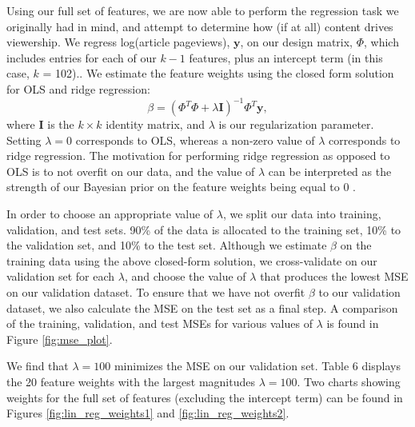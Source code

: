 \documentclass[fleqn,12pt]{SelfArx} %
\begin{document}
Using our full set of features, we are now able to perform the regression task we originally had in mind, and attempt to determine how (if at all) content drives viewership. We regress log(article pageviews), $\mathbf{y}$, on our design matrix, $\Phi$, which includes entries for each of our $k-1$ features, plus an intercept term (in this case, $k$ = 102).. We estimate the feature weights using the closed form solution for OLS and ridge regression:
\begin{equation}
\beta = (\Phi^T\Phi + \lambda \mathbf{I})^{-1}\Phi^T\mathbf{y},
\end{equation}
\noindent where $\mathbf{I}$ is the $k \times k$ identity matrix, and $\lambda$ is our regularization parameter. Setting $\lambda = 0$ corresponds to OLS, whereas a non-zero value of $\lambda$ corresponds to ridge regression. The motivation for performing ridge regression as opposed to OLS is to not overfit on our data, and the value of $\lambda$ can be interpreted as the strength of our Bayesian prior on the feature weights being equal to 0 \cite{ridgeregressionNotes}. 

In order to choose an appropriate value of $\lambda$, we split our data into training, validation, and test sets. 90\% of the data is allocated to the training set, 10\% to the validation set, and 10\% to the test set. Although we estimate $\beta$ on the training data using the above closed-form solution, we cross-validate on our validation set for each $\lambda$, and choose the value of $\lambda$ that produces the lowest MSE on our validation dataset. To ensure that we have not overfit $\beta$ to our validation dataset, we also calculate the MSE on the test set as a final step. A comparison of the training, validation, and test MSEs for various values of $\lambda$ is found in Figure \ref{fig:mse_plot}.

We find that $\lambda = 100$ minimizes the MSE on our validation set. Table 6 displays the 20 feature weights with the largest magnitudes $\lambda = 100$. Two charts showing weights for the full set of features (excluding the intercept term) can be found in Figures \ref{fig:lin_reg_weights1} and \ref{fig:lin_reg_weights2}.
\end{document}
